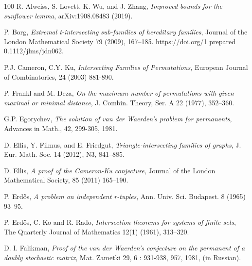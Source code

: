 \documentclass[11pt]{extarticle}
\numberwithin{equation}{section} %
\theoremstyle{plain}
\theoremstyle{definition}
\newcommand{\FF}{\mathcal{F}}
\newcommand{\m}{\mathcal}
\begin{document}







\begin{thebibliography}{100}
 R. Alweiss, S. Lovett, K. Wu, and J. Zhang, {\it Improved bounds for the sunflower lemma}, arXiv:1908.08483 (2019).

 P. Borg, {\it Extremal t-intersecting sub-families of hereditary families}, Journal of the London Mathematical Society 79 (2009), 167--185. https://doi.org/1 prepared 0.1112/jlms/jdn062.

 P.J. Cameron, C.Y. Ku, {\it Intersecting Families of Permutations}, European Journal of Combinatorics, 24 (2003) 881-890.

 P. Frankl and M. Deza, {\it On the maximum number of permutations with given maximal or minimal distance}, J. Combin. Theory, Ser. A 22 (1977), 352--360.

 G.P. Egorychev, \textit{The solution of van der Waerden’s problem for permanents}, Advances in Math., 42, 299-305, 1981.

 D. Ellis, Y. Filmus, and E. Friedgut, {\it Triangle-intersecting families of graphs}, J. Eur. Math. Soc. 14 (2012), N3, 841--885.

 D. Ellis, {\it A proof of the Cameron-Ku conjecture}, Journal of the London Mathematical Society, 85 (2011) 165–190.

 P. Erd\H os, \textit{A problem on independent r-tuples}, Ann. Univ. Sci. Budapest. 8 (1965) 93--95.

 P. Erd\H os, C. Ko and R. Rado, \textit{Intersection theorems for systems of finite sets}, The Quarterly Journal of Mathematics 12(1) (1961), 313--320.

 D. I. Falikman, \textit{Proof of the van der Waerden’s conjecture on the permanent of a doubly stochastic matrix}, Mat. Zametki 29, 6 : 931-938, 957, 1981, (in Russian).


\end{thebibliography}
\end{document}
